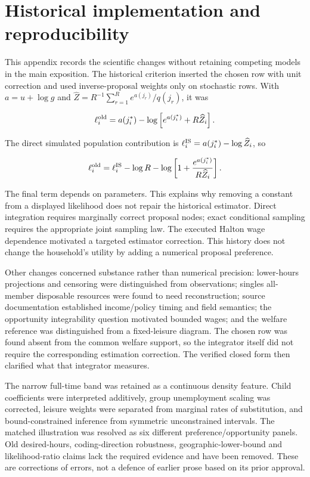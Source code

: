 \documentclass[11pt,a4paper]{article}
\begin{document}
\appendix

\section{Historical implementation and reproducibility}\label{historical-implementation-and-reproducibility}

This appendix records the scientific changes without retaining competing models in the main exposition. The historical criterion inserted the chosen row with unit correction and used inverse-proposal weights only on stochastic rows. With \(a=u+\log g\) and \(\widehat Z=R^{-1}\sum_{r=1}^R e^{a(j_r)}/q(j_r)\), it was

\[\ell_i^{\rm old}=a(j_i^*)-\log\left[e^{a(j_i^*)}+R\widehat Z_i\right].\]

The direct simulated population contribution is \(\ell_i^{\rm IS}=a(j_i^*)-\log\widehat Z_i\), so

\[\ell_i^{\rm old}=\ell_i^{\rm IS}-\log R-
\log\left[1+\frac{e^{a(j_i^*)}}{R\widehat Z_i}\right].\]

The final term depends on parameters. This explains why removing a constant from a displayed likelihood does not repair the historical estimator. Direct integration requires marginally correct proposal nodes; exact conditional sampling requires the appropriate joint sampling law. The executed Halton wage dependence motivated a targeted estimator correction. This history does not change the household's utility by adding a numerical proposal preference.

Other changes concerned substance rather than numerical precision: lower-hours projections and censoring were distinguished from observations; singles all-member disposable resources were found to need reconstruction; source documentation established income/policy timing and field semantics; the opportunity integrability question motivated bounded wages; and the welfare reference was distinguished from a fixed-leisure diagram. The chosen row was found absent from the common welfare support, so the integrator itself did not require the corresponding estimation correction. The verified closed form then clarified what that integrator measures.

The narrow full-time band was retained as a continuous density feature. Child coefficients were interpreted additively, group unemployment scaling was corrected, leisure weights were separated from marginal rates of substitution, and bound-constrained inference from symmetric unconstrained intervals. The matched illustration was resolved as six different preference/opportunity panels. Old desired-hours, coding-direction robustness, geographic-lower-bound and likelihood-ratio claims lack the required evidence and have been removed. These are corrections of errors, not a defence of earlier prose based on its prior approval.
\end{document}
